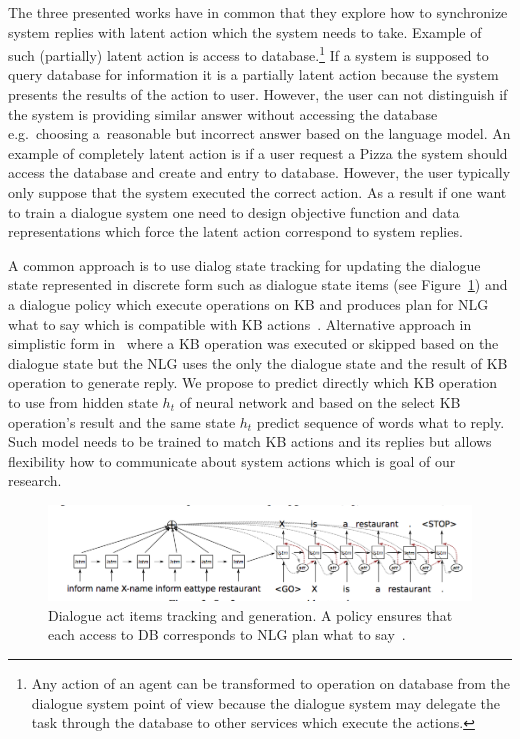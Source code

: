 \documentclass[11pt]{article}
\begin{document}
The three presented works have in common that they explore how to synchronize system replies with latent action which the system needs to take.
Example of such (partially) latent action is access to database.\footnote{Any action of an agent can be transformed to operation on database from the dialogue system point of view because the dialogue system may delegate the task through the database to other services which execute the actions.}
If a system is supposed to query database for information it is a partially latent action because the system presents the results of the action to user.
However, the user can not distinguish if the system is providing similar answer without accessing the database e.g.~choosing a~reasonable but incorrect answer based on the language model.
An example of completely latent action is if a user request a Pizza the system should access the database and create and entry to database.
However, the user typically only suppose that the system executed the correct action.
As a result if one want to train a dialogue system one need to design objective function and data representations which force the latent action correspond to system replies.

A common approach is to use dialog state tracking for updating the dialogue state represented in discrete form such as dialogue state items (see Figure~\ref{fig:dai_gen}) and a dialogue policy which execute operations on KB and produces plan for NLG what to say which is compatible with KB actions~\cite{dusek_sequence2sequence_2016,young2010hidden}.
Alternative approach in simplistic form in~\cite{wen_networkbased_2016} where a KB operation was executed or skipped based on the dialogue state but the NLG uses the only the dialogue state and the result of KB operation to generate reply.
We propose to predict directly which KB operation to use from hidden state $h_t$ of neural network and based on the select KB operation's result and the same state $h_t$ predict sequence of words what to reply.
Such model needs to be trained to match KB actions and its replies but allows flexibility how to communicate about system actions which is goal of our research.

\begin{figure}[htpb]
    \centering
    \includegraphics[width=1.0\linewidth]{dusek_seq2seq}
    \caption{Dialogue act items tracking and generation. A policy ensures that each access to DB corresponds to NLG plan what to say~\cite{dusek_sequence2sequence_2016}.}
    \label{fig:dai_gen}
\end{figure}
\end{document}
